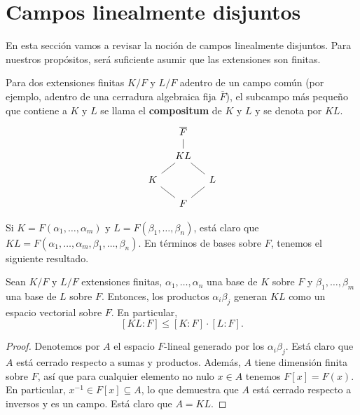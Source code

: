 
\section{Campos linealmente disjuntos}
\label{sec:campos-linealmente-disjuntos}

En esta sección vamos a revisar la noción de campos linealmente disjuntos. Para
nuestros propósitos, será suficiente asumir que las extensiones son finitas.

\begin{definicion}
  Para dos extensiones finitas $K/F$ y $L/F$ adentro de un campo común
  (por ejemplo, adentro de una cerradura algebraica fija $\overline{F}$),
  el subcampo más pequeño que contiene a $K$ y $L$ se llama el
  \textbf{compositum} de $K$ y $L$ y se denota por $KL$.
  \[ \begin{tikzcd}[row sep=1em,column sep=1em]
    & \overline{F}\ar[-]{d} \\
    & KL\ar[-]{dl}\ar[-]{dr} \\
    K\ar[-]{dr} & & L\ar[-]{dl} \\
    & F
  \end{tikzcd} \]
\end{definicion}

Si $K = F (\alpha_1,\ldots,\alpha_m)$ y $L = F (\beta_1,\ldots,\beta_n)$,
está claro que $KL = F (\alpha_1,\ldots,\alpha_m,\beta_1,\ldots,\beta_n)$.
En términos de bases sobre $F$, tenemos el siguiente resultado.

\begin{lema}
  Sean $K/F$ y $L/F$ extensiones finitas, $\alpha_1,\ldots,\alpha_n$
  una base de $K$ sobre $F$ y $\beta_1,\ldots,\beta_m$ una base de
  $L$ sobre $F$. Entonces, los productos $\alpha_i\beta_j$ generan
  $KL$ como un espacio vectorial sobre $F$. En particular,
  $$[KL : F] \le [K : F]\cdot [L : F].$$

  \begin{proof}
    Denotemos por $A$ el espacio $F$-lineal generado por los $\alpha_i\beta_j$.
    Está claro que $A$ está cerrado respecto a sumas y productos. Además, $A$
    tiene dimensión finita sobre $F$, así que para cualquier elemento no nulo
    $x \in A$ tenemos $F [x] = F (x)$. En particular,
    $x^{-1} \in F [x] \subseteq A$, lo que demuestra que $A$ está cerrado
    respecto a inversos y es un campo. Está claro que $A = KL$.
  \end{proof}
\end{lema}

